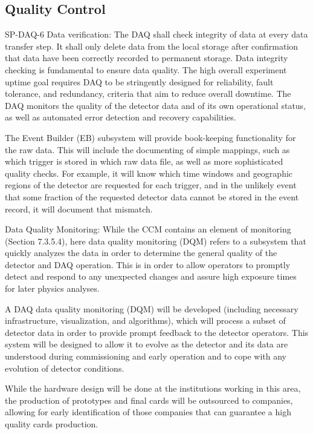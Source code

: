 \subsection{ Quality Control}

SP-DAQ-6 Data verification: The DAQ shall check integrity of data at
every data transfer step. It shall only delete data from the local
storage after confirmation that data have been correctly recorded to
permanent storage. Data integrity checking is fundamental to ensure
data quality. The high overall experiment uptime goal requires DAQ to
be stringently designed for reliability, fault tolerance, and
redundancy, criteria that aim to reduce overall downtime. The DAQ
monitors the quality of the detector data and of its own operational
status, as well as automated error detection and recovery
capabilities.

The Event Builder (EB) subsystem will provide book-keeping
functionality for the raw data. This will include the documenting of
simple mappings, such as which trigger is stored in which raw data
file, as well as more sophisticated quality checks. For example, it
will know which time windows and geographic regions of the detector
are requested for each trigger, and in the unlikely event that some
fraction of the requested detector data cannot be stored in the event
record, it will document that mismatch.

Data Quality Monitoring: While the CCM contains an element of
monitoring (Section 7.3.5.4), here data quality monitoring (DQM)
refers to a subsystem that quickly analyzes the data in order to
determine the general quality of the detector and DAQ operation. This
is in order to allow operators to promptly detect and respond to any
unexpected changes and assure high exposure times for later physics
analyses.

A DAQ data quality monitoring (DQM) will be developed (including
necessary infrastructure, visualization, and algorithms), which will
process a subset of detector data in order to provide prompt feedback
to the detector operators. This system will be designed to allow it to
evolve as the detector and its data are understood during
commissioning and early operation and to cope with any evolution of
detector conditions.

While the hardware design will be done at the institutions working in
this area, the production of prototypes and final cards will be
outsourced to companies, allowing for early identification of those
companies that can guarantee a high quality cards production.


